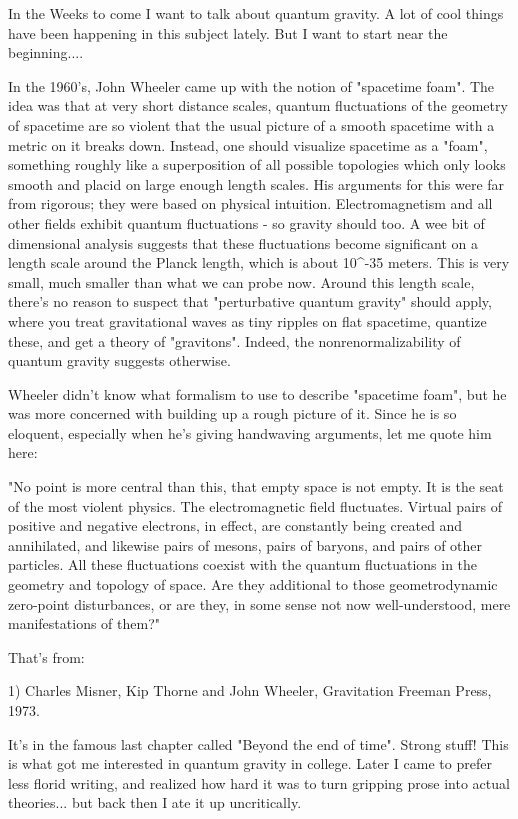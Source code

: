

In the Weeks to come I want to talk about quantum gravity.  A lot of
cool things have been happening in this subject lately.  But I want to
start near the beginning....

In the 1960's, John Wheeler came up with the notion of "spacetime foam".
The idea was that at very short distance scales, quantum fluctuations of
the geometry of spacetime are so violent that the usual picture of a
smooth spacetime with a metric on it breaks down.  Instead, one should
visualize spacetime as a "foam", something roughly like a superposition 
of all possible topologies which only looks smooth and placid on large 
enough length scales.  His arguments for this were far from rigorous; 
they were based on physical intuition.  Electromagnetism and all other 
fields exhibit quantum fluctuations - so gravity should too.  A wee 
bit of dimensional analysis suggests that these fluctuations become 
significant on a length scale around the Planck length, which is
about 10^{-35} meters.  This is very small, much smaller than what we
can probe now.  Around this length scale, there's no reason to suspect
that "perturbative quantum gravity" should apply, where you treat 
gravitational waves as tiny ripples on flat spacetime, quantize these, 
and get a theory of "gravitons".  Indeed, the nonrenormalizability 
of quantum gravity suggests otherwise.

Wheeler didn't know what formalism to use to describe "spacetime foam",
but he was more concerned with building up a rough picture of it.  Since
he is so eloquent, especially when he's giving handwaving arguments, let
me quote him here:

"No point is more central than this, that empty space is not empty.  It
is the seat of the most violent physics.  The electromagnetic field
fluctuates.  Virtual pairs of positive and negative electrons, in
effect, are constantly being created and annihilated, and likewise pairs
of \mu  mesons, pairs of baryons, and pairs of other particles.  All these
fluctuations coexist with the quantum fluctuations in the geometry and
topology of space.  Are they additional to those geometrodynamic
zero-point disturbances, or are they, in some sense not now
well-understood, mere manifestations of them?"

That's from:

1) Charles Misner, Kip Thorne and John Wheeler, Gravitation
Freeman Press, 1973.

It's in the famous last chapter called "Beyond the end of time".  Strong
stuff!  This is what got me interested in quantum gravity in college.
Later I came to prefer less florid writing, and realized how hard it was
to turn gripping prose into actual theories... but back then I ate it up
uncritically.  

